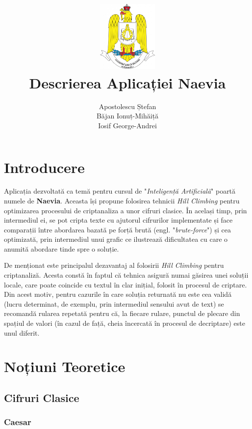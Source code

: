 \documentclass{article}
\title{
    \includegraphics[width=3cm, height=3.5cm]{images/ATM.png} \\
    \vspace{5mm}
    Descrierea Aplicației \textbf{Naevia}
    \vspace{10mm}
}
\author{
    Apostolescu Ștefan \\
    Băjan Ionuț-Mihăiță \\
    Iosif George-Andrei \\
    \vspace{10mm}
}
\begin{document}
\null
\nointerlineskip 
\vfill
\let\snewpage \newpage
\let\newpage \relax
\clearpage\maketitle
\thispagestyle{empty}
\let \newpage \snewpage
\vfill 
\break

\newpage

\setcounter{page}{1}
\tableofcontents

\newpage

\section{Introducere}

Aplicația dezvoltată ca temă pentru cursul de "\textit{Inteligență Artificială}" poartă numele de \textbf{Naevia}. Aceasta își propune folosirea tehnicii \textit{Hill Climbing} pentru optimizarea procesului de criptanaliza a unor cifruri clasice. În același timp, prin intermediul ei, se pot cripta texte cu ajutorul cifrurilor implementate și face comparații între abordarea bazată pe forță brută (engl. "\textit{brute-force}") și cea optimizată, prin intermediul unui grafic ce ilustrează dificultatea cu care o anumită abordare tinde spre o soluție. 

De menționat este principalul dezavantaj al folosirii \textit{Hill Climbing} pentru criptanaliză. Acesta constă în faptul că tehnica asigură numai găsirea unei soluții locale, care poate coincide cu textul în clar inițial, folosit în procesul de criptare. Din acest motiv, pentru cazurile în care soluția returnată nu este cea validă (lucru determinat, de exemplu, prin intermediul sensului avut de text) se recomandă rularea repetată pentru că, la fiecare rulare, punctul de plecare din spațiul de valori (în cazul de față, cheia încercată în procesul de decriptare) este unul diferit.

\section{Noțiuni Teoretice}

\subsection{Cifruri Clasice}

\subsubsection{Caesar}
\end{document}
